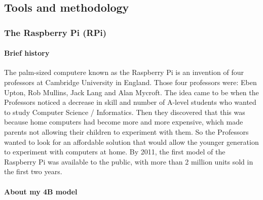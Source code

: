 \hypertarget{tools-and-methodology}{%
\subsection{Tools and methodology}\label{tools-and-methodology}}

\hypertarget{the-raspberry-pi-rpi}{%
\subsubsection{The Raspberry Pi (RPi)}\label{the-raspberry-pi-rpi}}

\hypertarget{brief-history}{%
\paragraph{Brief history}\label{brief-history}}

The palm-sized computere known as the Raspberry Pi is an invention of
four professors at Cambridge University in England. Those four
professors were: Eben Upton, Rob Mullins, Jack Lang and Alan Mycroft.
The idea came to be when the Professors noticed a decrease in skill and
number of A-level students who wanted to study Computer Science /
Informatics. Then they discovered that this was because home computers
had become more and more expensive, which made parents not allowing
their children to experiment with them. So the Professors wanted to look
for an affordable solution that would allow the younger generation to
experiment with computers at home. By 2011, the first model of the
Raspberry Pi was available to the public, with more than 2 million units
sold in the first two years.

\pagebreak

\hypertarget{about-my-4b-model}{%
\paragraph{About my 4B model}\label{about-my-4b-model}}

